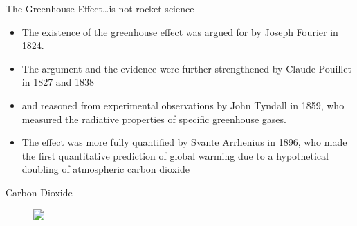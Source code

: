 \documentclass[hide notes,intlimits]{beamer}
\begin{document}
\begin{frame}
    \begin{figure}
    \end{figure}
\end{frame}

\begin{frame}{The Greenhouse Effect\ldots{}is not rocket science}
  \begin{itemize}
  \item The existence of the greenhouse effect was argued for by Joseph Fourier in 1824.
  \item The argument and the evidence were further strengthened by Claude Pouillet in 1827 and 1838 
  \item and reasoned from experimental observations by John Tyndall in 1859, who measured the radiative properties of specific greenhouse gases.
  \item The effect was more fully quantified by Svante Arrhenius in 1896, who made the first quantitative prediction of global warming due to a hypothetical doubling of atmospheric carbon dioxide
  \end{itemize}
\end{frame}

\begin{frame}{Carbon Dioxide}
      \begin{figure}
        \includegraphics<1>[width=\textwidth]{nasa_co2-graph}
      \end{figure}
\end{frame}
\end{document}
